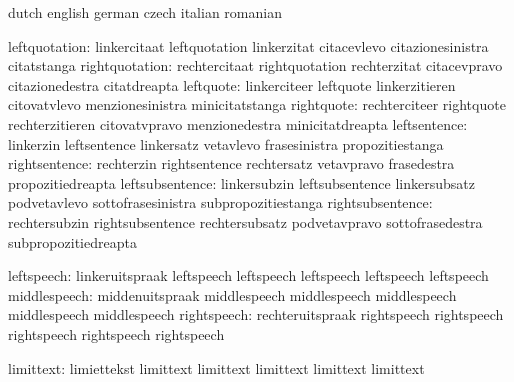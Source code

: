 
\startconstants            dutch                     english
                           german                    czech
                           italian                   romanian

            leftquotation: linkercitaat              leftquotation
                           linkerzitat               citacevlevo
                           citazionesinistra         citatstanga
           rightquotation: rechtercitaat             rightquotation
                           rechterzitat              citacevpravo
                           citazionedestra           citatdreapta
                leftquote: linkerciteer              leftquote
                           linkerzitieren            citovatvlevo
                           menzionesinistra          minicitatstanga
               rightquote: rechterciteer             rightquote
                           rechterzitieren           citovatvpravo
                           menzionedestra            minicitatdreapta
             leftsentence: linkerzin                 leftsentence
                           linkersatz                vetavlevo
                           frasesinistra             propozitiestanga
            rightsentence: rechterzin                rightsentence
                           rechtersatz               vetavpravo
                           frasedestra               propozitiedreapta
          leftsubsentence: linkersubzin              leftsubsentence
                           linkersubsatz             podvetavlevo
                           sottofrasesinistra        subpropozitiestanga
         rightsubsentence: rechtersubzin             rightsubsentence
                           rechtersubsatz            podvetavpravo
                           sottofrasedestra          subpropozitiedreapta

               leftspeech: linkeruitspraak           leftspeech
                           leftspeech                leftspeech
                           leftspeech                leftspeech %
             middlespeech: middenuitspraak           middlespeech
                           middlespeech              middlespeech
                           middlespeech              middlespeech %
              rightspeech: rechteruitspraak          rightspeech
                           rightspeech               rightspeech
                           rightspeech               rightspeech %

                limittext: limiettekst               limittext 
                           limittext                 limittext 
                           limittext                 limittext
  
